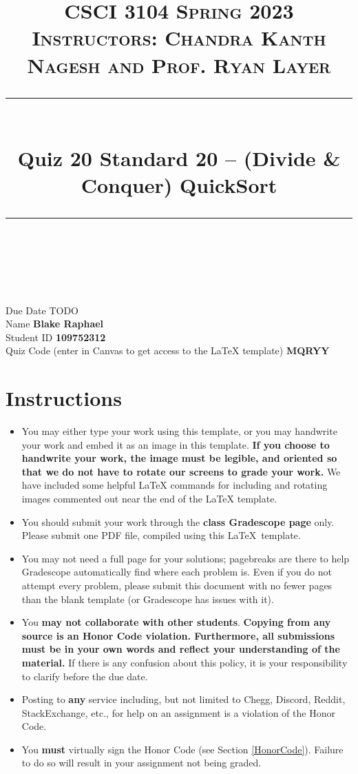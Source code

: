 \documentclass[11pt]{article}
\title{
\normalfont \normalsize 
\textsc{CSCI 3104 Spring 2023 \\ 
Instructors: Chandra Kanth Nagesh and Prof. Ryan Layer} \\
[10pt] 
\rule{\linewidth}{0.5pt} \\[6pt] 
\huge Quiz 20 Standard 20 -- (Divide \& Conquer) QuickSort \\
\rule{\linewidth}{2pt}  \\[10pt]
}
\date{}
\theoremstyle{definition}
\theoremstyle{definition}
\theoremstyle{definition}
\begin{document}

\maketitle


\noindent
Due Date \dotfill TODO \\
Name \dotfill \textbf{Blake Raphael} \\
Student ID \dotfill \textbf{109752312} \\
Quiz Code (enter in Canvas to get access to the LaTeX template) \dotfill \textbf{MQRYY}


\tableofcontents

\section*{Instructions}
 \begin{itemize}
	\item You may either type your work using this template, or you may handwrite your work and embed it as an image in this template. \textbf{If you choose to handwrite your work, the image must be legible, and oriented so that we do not have to rotate our screens to grade your work.} We have included some helpful LaTeX commands for including and rotating images commented out near the end of the LaTeX template.
	\item You should submit your work through the \textbf{class Gradescope page} only. Please submit one PDF file, compiled using this \LaTeX \ template.
	\item You may not need a full page for your solutions; pagebreaks are there to help Gradescope automatically find where each problem is. Even if you do not attempt every problem, please submit this document with no fewer pages than the blank template (or Gradescope has issues with it).

	\item You \textbf{may not collaborate with other students}. \textbf{Copying from any source is an Honor Code violation. Furthermore, all submissions must be in your own words and reflect your understanding of the material.} If there is any confusion about this policy, it is your responsibility to clarify before the due date. 

	\item Posting to \textbf{any} service including, but not limited to Chegg, Discord, Reddit, StackExchange, etc., for help on an assignment is a violation of the Honor Code.

	\item You \textbf{must} virtually sign the Honor Code (see Section \ref{HonorCode}). Failure to do so will result in your assignment not being graded.
\end{itemize}
\end{document}
